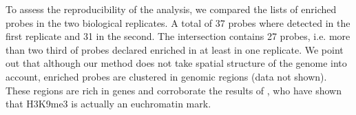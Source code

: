 \documentclass{llncs}
\begin{document}
To assess the reproducibility of the analysis, we compared the lists
of enriched probes in the two biological replicates. A total of 37
probes where detected in the first replicate and 31 in the second.
The intersection contains 27 probes, i.e.
more than two third of probes declared enriched in at least in one
replicate. We point out that although our method does not take spatial structure of the
genome into account, enriched probes are clustered in genomic regions
(data not shown). These regions are rich in genes and
corroborate the results of \cite{Turck07}, who
have shown that H3K9me3 is actually an euchromatin mark.



\end{document}
